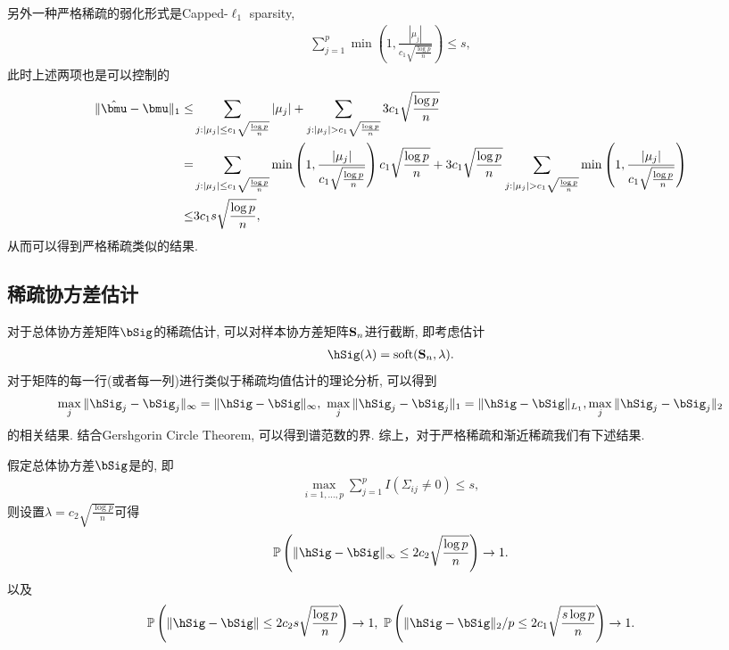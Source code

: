 \begin{remark}
另外一种严格稀疏的弱化形式是Capped-$\ell_1$ sparsity\citep{zhang2012general}, 
\begin{align*}
	\sum_{j=1}^p \min\left(1,\frac{|\mu_j|}{c_1 \sqrt{\frac{\log p}{n}}}\right) \leq s,
\end{align*}
此时上述两项也是可以控制的
\begin{align*}
	\|\hat{\bmu}-\bmu\|_1\leq & \sum_{j: |\mu_j|\leq c_1 \sqrt{\frac{\log p}{n}} } |\mu_j|+\sum_{j: |\mu_j|>c_1 \sqrt{\frac{\log p}{n}} } 3 c_1 \sqrt{\frac{\log p}{n}}\\
=&\sum_{j: |\mu_j|\leq c_1 \sqrt{\frac{\log p}{n}} } \min\left(1,\frac{|\mu_j|}{c_1 \sqrt{\frac{\log p}{n}}}\right)  c_1 \sqrt{\frac{\log p}{n}}+3 c_1 \sqrt{\frac{\log p}{n}} \sum_{j: |\mu_j|> c_1 \sqrt{\frac{\log p}{n}} } \min\left(1,\frac{|\mu_j|}{c_1 \sqrt{\frac{\log p}{n}}}\right)  \\
\leq & 3c_1 s \sqrt{\frac{\log p}{n}},
\end{align*}
从而可以得到严格稀疏类似的结果.
\end{remark}

\subsection{稀疏协方差估计}
对于总体协方差矩阵$\bSig$的稀疏估计, 可以对样本协方差矩阵$\S_n$进行截断, 即考虑估计
\begin{align*}
	\hSig(\lambda)=\soft(\S_n,\lambda).
\end{align*}
对于矩阵的每一行(或者每一列)进行类似于稀疏均值估计的理论分析, 可以得到
\begin{align*}
	\max_{j} \|\hSig_j-\bSig_j\|_\infty=\|\hSig-\bSig\|_\infty,~\max_{j} \|\hSig_j-\bSig_j\|_1=\|\hSig-\bSig\|_{L_1}, \max_{j} \|\hSig_j-\bSig_j\|_2
\end{align*}
的相关结果. 结合Gershgorin Circle Theorem, 可以得到谱范数的界. 综上，对于严格稀疏和渐近稀疏我们有下述结果.

\begin{prop}[严格稀疏协方差估计]
    假定总体协方差$\bSig$是的, 即
    \begin{align*}
        \max_{i=1,\ldots,p} \sum_{j=1}^p I(\Sigma_{ij} \neq 0) \leq s,
    \end{align*}	
    则设置$\lambda=c_2 \sqrt{\frac{\log p}{n}}$可得
    \begin{align*}
        \Pr\left(\|\hSig-\bSig\|_\infty\leq 2c_2\sqrt{\frac{\log p}{n}}\right) \to 1.
    \end{align*}
    以及
    \begin{align*}
        \Pr\left(\|\hSig-\bSig\| \leq 2c_2 s\sqrt{\frac{\log p}{n}}\right) \to 1,~\Pr\left(\|\hSig-\bSig\|_2/p\leq 2c_1\sqrt{\frac{s\log p}{n}}\right) \to 1.
    \end{align*}
    \end{prop}



